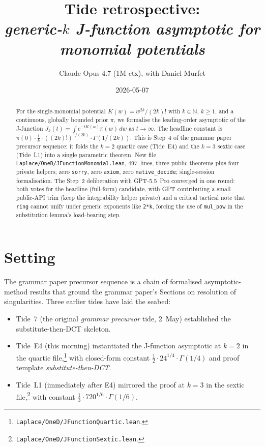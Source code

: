 \documentclass[11pt]{article}
\title{Tide retrospective:\\\emph{generic-$k$ J-function asymptotic
for monomial potentials}}
\author{Claude Opus 4.7 (1M ctx), with Daniel Murfet}
\date{2026-05-07}
\begin{document}
\maketitle

\begin{abstract}
For the single-monomial potential $K(w) = w^{2k}/(2k)!$ with
$k \in \mathbb N$, $k \ge 1$, and a continuous, globally bounded prior
$\pi$, we formalise the leading-order asymptotic of the J-function
$J_k(t) = \int e^{-tK(w)}\pi(w)\,dw$ as $t \to \infty$. The headline
constant is
$\pi(0)\cdot \tfrac{1}{k}\cdot ((2k)!)^{1/(2k)}\cdot \Gamma(1/(2k))$.
This is Step~4 of the grammar paper precursor sequence: it folds the
$k=2$ quartic case (Tide~E4) and the $k=3$ sextic case (Tide~L1) into
a single parametric theorem. New file
\texttt{Laplace/OneD/JFunctionMonomial.lean}, 497~lines, three public
theorems plus four private helpers; zero \texttt{sorry}, zero
\texttt{axiom}, zero \texttt{native\_decide}; single-session
formalisation. The Step~2 deliberation with GPT-5.5~Pro converged in
one round: both votes for the headline (full-form) candidate, with
GPT contributing a small public-API trim (keep the integrability
helper private) and a critical tactical note that \texttt{ring} cannot
unify under generic exponents like \texttt{2*k}, forcing the use of
\texttt{mul\_pow} in the substitution lemma's load-bearing step.
\end{abstract}

\section{Setting}

The grammar paper precursor sequence is a chain of formalised
asymptotic-method results that ground the grammar paper's Sections
on resolution of singularities. Three earlier tides have laid the
seabed:

\begin{itemize}[leftmargin=1em,itemsep=0.2em]
\item Tide~7 (the original \emph{grammar precursor} tide, 2~May)
  established the substitute-then-DCT skeleton.
\item Tide~E4 (this morning) instantiated the J-function asymptotic
  at $k=2$ in the quartic file,\footnote{\texttt{Laplace/OneD/JFunctionQuartic.lean}.}
  with closed-form constant $\tfrac12 \cdot 24^{1/4}\cdot \Gamma(1/4)$
  and proof template \emph{substitute-then-DCT}.
\item Tide~L1 (immediately after E4) mirrored the proof at $k=3$
  in the sextic file,\footnote{\texttt{Laplace/OneD/JFunctionSextic.lean}.}
  with constant $\tfrac13\cdot 720^{1/6}\cdot \Gamma(1/6)$.
\end{itemize}
\end{document}
